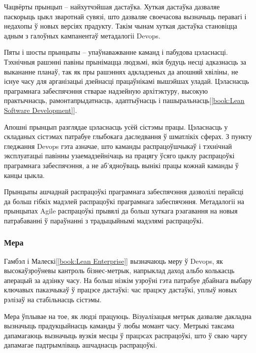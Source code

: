 Чацвёрты прынцып -- найхутчэйшая дастаўка.
Хуткая дастаўка дазваляе паскорыць цыкл зваротнай сувязі, што
дазваляе своечасова вызначыць перавагі і недахопы ў новых
версіях прадукту.
Такім чынам хуткая дастаўка становіцца адным з галоўных кампанентаў
метадалогіі Devops.


Пяты і шосты прынцыпы -- упаўнаважванне каманд і пабудова цэласнасці.
Тэхнічныя рашэнні павіны прынімацца людзьмі, якія будуць несці
адказнасць за выкананне планаў, так як пры рашэннях адкладзеных
да апошняй хвіліны, не існуе часу для арганізацыі дзейнасці
працаўнікамі вышэйшах уладай.
Цэласнасць праграмнага забеспячэння стварае надзейную архітэктуру,
высокую практычнасць, рамонтапрыдатнасць, адаптыўнасць
і пашыральнасць[\ref{book:Lean Software Development}].

Апошні прынцып разглядае цэласнасць усёй сістэмы працы.
Цэласнасць у складаных сістэмах патрабуе глыбокага
даследвання ў шматлікіх сферах.
З пункту гледжання Devops гэта азначае, што каманды
распрацоўшчыкаў і тэхнічнай эксплуатацыі павінны
узаемадзейнічаць на працягу ўсяго цыклу распрацоўкі
праграмнага забеспячэння, а не аб'ядноўваць вынікі
працы кожнай каманды ў канцы цыкла.

Прынцыпы ашчаднай распрацоўкі праграмнага забеспячэння
дазволілі перайсці да больш гібкіх мадэлей распрацоўкі
праграмнага забеспячэння.
Метадалогіі на прынцыпах Agile распрацоўкі прывялі да
больш хуткага рэагавання на новыя патрабаванні ў параўнанні
з традыцыйнымі мадэлямі распрацоўкі.

\subsubsection{Мера}
Гамбэл і Малескі[\ref{book:Lean Enterprise}] вызначаюць меру
ў Devops, як высокаўзроўневы кантроль бізнес-метрык,
напрыклад даход альбо колькасць аперацый за адзінку часу.
На больш нізкім узроўні гэта патрабуе дбайнага выбару ключавых
паказчыкаў ў працэсе дастаўкі: час працэсу дастаўкі,
уплыў новых рэлізаў на стабільнасць сістэмы.

Мера ўплывае на тое, як людзі працуюць.
Візуалізацыя метрык дазваляе дакладна
вызначыць прадукцыйнасць каманды ў любы момант часу.
Метрыкі таксама дапамагаюць вызначыць
вузкія месцы ў працэсах распрацоўкі, што ў сваю чаргу
дапамагае падтрымліваць ашчаднасць распрацоўкі.

